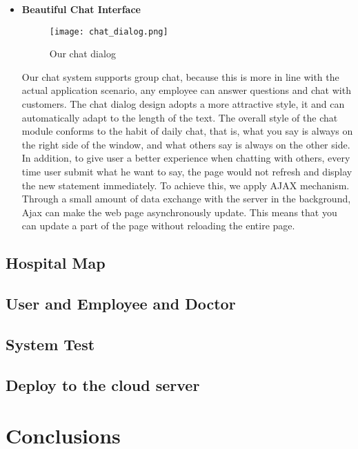 \documentclass[a4paper]{article}
\begin{document}
\begin{itemize}
     \item \textbf{Beautiful Chat Interface}
     \begin{figure}[h]
         \centering
         \texttt{[image: chat\_dialog.png]}
         \caption{Our chat dialog}
         \label{chat_dialog}
     \end{figure}
     \newline
     Our chat system supports group chat, because this is more in line with the actual application scenario, any employee can answer questions and chat with customers. The chat dialog design adopts a more attractive style, it and can automatically adapt to the length of the text. The overall style of the chat module conforms to the habit of daily chat, that is, what you say is always on the right side of the window, and what others say is always on the other side. 
     \newline
     In addition, to give user a better experience when chatting with others, every time user submit what he want to say, the page would not refresh and display the new statement immediately. To achieve this, we apply AJAX mechanism. Through a small amount of data exchange with the server in the background, Ajax can make the web page asynchronously update. This means that you can update a part of the page without reloading the entire page.
\end{itemize}

% 


\subsection{Hospital Map}

\subsection{User and Employee and Doctor}

\subsection{System Test}

\subsection{Deploy to the cloud server}

\section{Conclusions}
\end{document}
